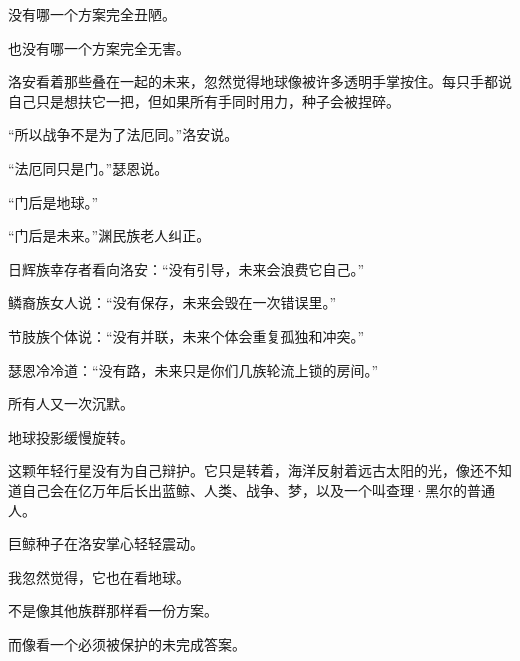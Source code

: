 没有哪一个方案完全丑陋。

也没有哪一个方案完全无害。

洛安看着那些叠在一起的未来，忽然觉得地球像被许多透明手掌按住。每只手都说自己只是想扶它一把，但如果所有手同时用力，种子会被捏碎。

“所以战争不是为了法厄同。”洛安说。

“法厄同只是门。”瑟恩说。

“门后是地球。”

“门后是未来。”渊民族老人纠正。

日辉族幸存者看向洛安：“没有引导，未来会浪费它自己。”

鳞裔族女人说：“没有保存，未来会毁在一次错误里。”

节肢族个体说：“没有并联，未来个体会重复孤独和冲突。”

瑟恩冷冷道：“没有路，未来只是你们几族轮流上锁的房间。”

所有人又一次沉默。

地球投影缓慢旋转。

这颗年轻行星没有为自己辩护。它只是转着，海洋反射着远古太阳的光，像还不知道自己会在亿万年后长出蓝鲸、人类、战争、梦，以及一个叫查理·黑尔的普通人。

巨鲸种子在洛安掌心轻轻震动。

我忽然觉得，它也在看地球。

不是像其他族群那样看一份方案。

而像看一个必须被保护的未完成答案。

